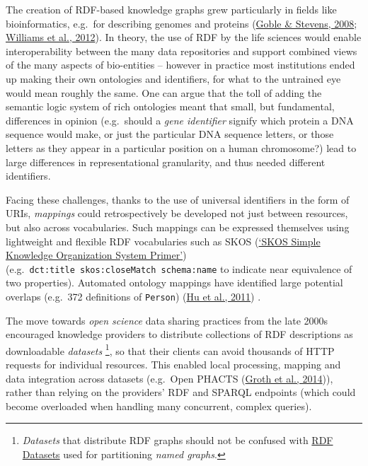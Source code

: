 The creation of RDF-based knowledge graphs grew particularly in fields like bioinformatics, e.g.~for describing genomes and proteins (\protect\hyperlink{ref-bMSxa8XW}{Goble \& Stevens, 2008}; \protect\hyperlink{ref-Qlrlr2TZ}{Williams et al., 2012}). In theory, the use of RDF by the life sciences would enable interoperability between the many data repositories and support combined views of the many aspects of bio-entities -- however in practice most institutions ended up making their own ontologies and identifiers, for what to the untrained eye would mean roughly the same. One can argue that the toll of adding the semantic logic system of rich ontologies meant that small, but fundamental, differences in opinion (e.g.~should a \emph{gene identifier} signify which protein a DNA sequence would make, or just the particular DNA sequence letters, or those letters as they appear in a particular position on a human chromosome?) lead to large differences in representational granularity, and thus needed different identifiers.

Facing these challenges, thanks to the use of universal identifiers in the form of URIs, \emph{mappings} could retrospectively be developed not just between resources, but also across vocabularies. Such mappings can be expressed themselves using lightweight and flexible RDF vocabularies such as SKOS (\protect\hyperlink{ref-15gQDya5B}{{`SKOS Simple Knowledge Organization System Primer'}}) (e.g.~\texttt{dct:title\ skos:closeMatch\ schema:name} to indicate near equivalence of two properties). Automated ontology mappings have identified large potential overlaps (e.g.~372 definitions of \texttt{Person}) (\protect\hyperlink{ref-FDDmgO6s}{Hu et al., 2011}) .

The move towards \emph{open science} data sharing practices from the late 2000s encouraged knowledge providers to distribute collections of RDF descriptions as downloadable \emph{datasets} \footnote{\emph{Datasets} that distribute RDF graphs should not be confused with \href{https://www.w3.org/TR/rdf11-concepts/\#section-dataset}{RDF Datasets} used for partitioning \emph{named graphs}.}, so that their clients can avoid thousands of HTTP requests for individual resources. This enabled local processing, mapping and data integration across datasets (e.g.~Open PHACTS (\protect\hyperlink{ref-191ZkYZMt}{Groth et al., 2014})), rather than relying on the providers' RDF and SPARQL endpoints (which could become overloaded when handling many concurrent, complex queries).

